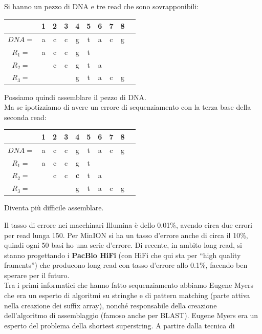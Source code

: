 \documentclass[a4paper,12pt, oneside]{book}
\begin{document}
\begin{esempio}
  Si hanno un pezzo di DNA e tre read che sono sovrapponibili:
  \begin{table}[H]
    \centering
    \begin{tabular}{cccccccccc}
      \hline
      & 1 & 2 & 3 & 4 & 5 &6 &7 &8\\
      \hline
      $DNA=$ & a & c & c & g & t &a &c &g\\
      \hline
      $R_1=$ & a & c & c & g & t &&&\\
      $R_2=$ &  & c & c & g & t & a &&\\
      $R_3=$ &  &  &  & g &t & a &c & g&\\
    \end{tabular}
  \end{table}
  Possiamo quindi assemblare il pezzo di DNA.\\
  Ma se ipotizziamo di avere un errore di sequenziamento con la terza base della
  seconda read:
   \begin{table}[H]
    \centering
    \begin{tabular}{cccccccccc}
      \hline
      & 1 & 2 & 3 & 4 & 5 &6 &7 &8\\
      \hline
      $DNA=$ & a & c & c & g & t &a &c &g\\
      \hline
      $R_1=$ & a & c & c & g & t &&&\\
      $R_2=$ &  & c & c & \textbf{c} & t & a &&\\
      $R_3=$ &  &  &  & g &t & a &c & g&\\
    \end{tabular}
  \end{table}
  Diventa più difficile assemblare.
\end{esempio}
Il tasso di errore nei macchinari Illumina è dello 0.01\%, avendo circa due
errori per read lunga 150. Per MinION si ha un tasso d'errore anche di circa il
10\%, quindi ogni 50 basi ho una serie d'errore. Di recente, in ambito long
read, si stanno progettando i \textbf{PacBio HiFi} (con HiFi che qui sta per
``high quality framents'') che producono long read con tasso d'errore allo
0.1\%, facendo ben sperare per il futuro.\\
Tra i primi informatici che hanno fatto sequenziamento abbiamo Eugene Myers che
era un esperto di algoritmi su stringhe e di pattern matching (parte attiva
nella creazione dei suffix array), nonché responsabile della creazione
dell'algoritmo di assemblaggio (famoso anche per BLAST). Eugene Myers era un
esperto del problema della shortest superstring. A partire dalla tecnica di
\end{document}
